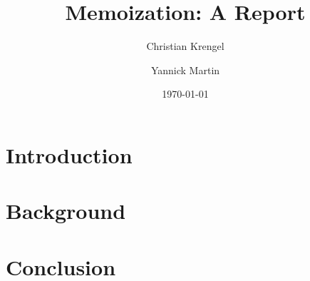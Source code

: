 \documentclass[11pt,a4paper]{article}
\title{Memoization: A Report}
\author{ Christian Krengel \and Yannick Martin }
\date{\today}
\begin{document}
\maketitle

\begin{abstract}

\lipsum[1][1-3]
\end{abstract}

\section{Introduction}
\lipsum[2]

\section{Background}
\lipsum[3]

\section{Conclusion}
\lipsum[4][1-4]
\end{document}
